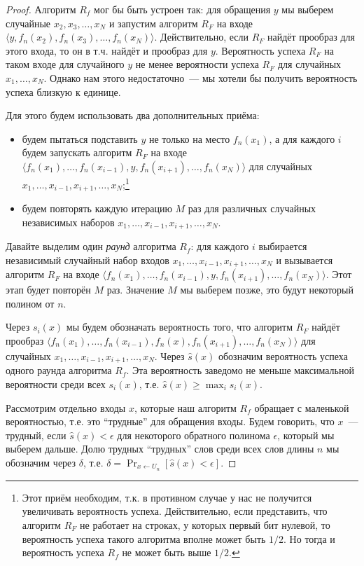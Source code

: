 \documentclass[12pt,a4paper]{article}
\theoremstyle{definition}
\theoremstyle{plain}
\theoremstyle{remark}
\begin{document}
\begin{proof}
Алгоритм $R_f$ мог бы быть устроен так: для обращения $y$ мы выберем 
случайные $x_2, x_3,\dotsc,x_N$ и запустим алгоритм $R_F$ на входе
$\langle y, f_n(x_2), f_n(x_3),\dotsc,f_n(x_N)\rangle$. Действительно,
если $R_F$ найдёт прообраз для этого входа, то он в т.ч. найдёт
и прообраз для $y$. Вероятность успеха $R_F$ на таком входе 
для случайного $y$ не менее вероятности успеха $R_F$ для случайных
$x_1,\dotsc,x_N$. Однако нам этого недостаточно~--- мы хотели бы получить
вероятность успеха близкую к единице. 

Для этого будем использовать два дополнительных приёма:
\begin{itemize}
\item будем пытаться подставить $y$ не только на место $f_n(x_1)$, а 
для каждого $i$ будем запускать алгоритм $R_F$ на входе
$\langle f_n(x_1),\dotsc, f_n(x_{i-1}), y,  f_n(x_{i+1}),\dotsc,f_n(x_N)\rangle$ для случайных
$x_1,\dotsc, x_{i-1}, x_{i+1},\dotsc,x_N$;\footnote{Этот приём необходим, т.к. в противном случае
у нас не получится увеличивать вероятность успеха. Действительно, если представить, что алгоритм 
$R_F$ не работает на строках, у которых первый бит нулевой, то вероятность успеха такого алгоритма
вполне может быть $1/2$. Но тогда и вероятность успеха $R_f$ не может быть выше $1/2$.}
\item будем повторять каждую итерацию $M$ раз для различных случайных независимых наборов $x_1,\dotsc, x_{i-1},x_{i+1},\dotsc,x_N$.
\end{itemize}

Давайте выделим один \emph{раунд} алгоритма $R_f$: для каждого $i$ выбирается 
независимый случайный набор входов $x_1,\dotsc, x_{i-1},x_{i+1},\dotsc,x_N$
и вызывается алгоритм $R_F$ на входе 
$\langle f_n(x_1),\dotsc, f_n(x_{i-1}), y,  f_n(x_{i+1}),\dotsc,f_n(x_N)\rangle$.
Этот этап будет повторён $M$ раз. Значение $M$ мы выберем позже, это будут некоторый полином от $n$. 

Через $s_i(x)$ мы будем обозначать вероятность того, что алгоритм $R_F$ найдёт прообраз
$\langle f_n(x_1),\dotsc, f_n(x_{i-1}), f_n(x),  f_n(x_{i+1}),\dotsc,f_n(x_N)\rangle$
для случайных $x_1,\dotsc, x_{i-1},x_{i+1},\dotsc,x_N$. Через $\hat s(x)$ обозначим
вероятность успеха одного раунда алгоритма $R_f$. Эта вероятность заведомо не меньше
максимальной вероятности среди всех $s_i(x)$, т.е. $\hat s(x) \ge \max_i s_i(x)$. 

Рассмотрим отдельно входы $x$, которые наш алгоритм $R_f$ обращает с маленькой
вероятностью, т.е. это ``трудные'' для обращения входы. Будем говорить, что $x$~--- трудный, 
если $\hat s(x) < \epsilon$ для некоторого обратного полинома $\epsilon$,
который мы выберем дальше. 
Долю трудных ``трудных'' слов среди всех слов длины $n$ мы обозначим через $\delta$,
т.е. $\delta = \Pr_{x\gets U_n}[\hat s(x) < \epsilon]$. 


\end{proof}
\end{document}
